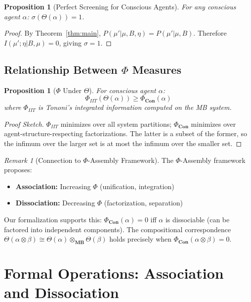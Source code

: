 \documentclass[11pt,a4paper]{article}
\theoremstyle{definition}
\theoremstyle{plain}
\newtheorem{proposition}[definition]{Proposition}
\theoremstyle{remark}
\newtheorem{remark}[definition]{Remark}
\newcommand{\Con}{\mathbf{Con}}
\newcommand{\MB}{\mathbf{MB}}
\begin{document}
\begin{proposition}[Perfect Screening for Conscious Agents]
For any conscious agent $\alpha$: $\sigma(\Theta(\alpha)) = 1$.
\end{proposition}

\begin{proof}
By Theorem~\ref{thm:main}, $P(\mu' | \mu, B, \eta) = P(\mu' | \mu, B)$. Therefore $I(\mu'; \eta | B, \mu) = 0$, giving $\sigma = 1$.
\end{proof}

\subsection{Relationship Between $\Phi$ Measures}

\begin{proposition}[$\Phi$ Under $\Theta$]
For conscious agent $\alpha$:
\[
\Phi_{IIT}(\Theta(\alpha)) \geq \Phi_{\Con}(\alpha)
\]
where $\Phi_{IIT}$ is Tononi's integrated information computed on the MB system.
\end{proposition}

\begin{proof}[Proof Sketch]
$\Phi_{IIT}$ minimizes over all system partitions; $\Phi_{\Con}$ minimizes over agent-structure-respecting factorizations. The latter is a subset of the former, so the infimum over the larger set is at most the infimum over the smaller set.
\end{proof}

\begin{remark}[Connection to $\Phi$-Assembly Framework]
The $\Phi$-Assembly framework proposes:
\begin{itemize}
    \item \textbf{Association:} Increasing $\Phi$ (unification, integration)
    \item \textbf{Dissociation:} Decreasing $\Phi$ (factorization, separation)
\end{itemize}
Our formalization supports this: $\Phi_{\Con}(\alpha) = 0$ iff $\alpha$ is dissociable (can be factored into independent components). The compositional correspondence $\Theta(\alpha \otimes \beta) \cong \Theta(\alpha) \otimes_{\MB} \Theta(\beta)$ holds precisely when $\Phi_{\Con}(\alpha \otimes \beta) = 0$.
\end{remark}

\section{Formal Operations: Association and Dissociation}\label{sec:assoc-dissoc}
\end{document}
